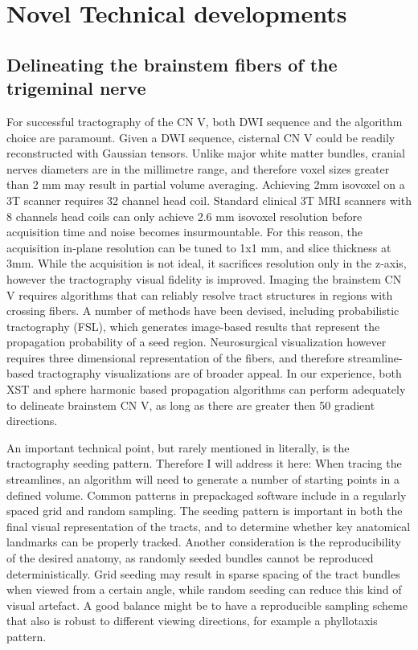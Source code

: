\section{Novel Technical developments}

\subsection{Delineating the brainstem fibers of the trigeminal nerve}

For successful tractography of the CN V, both DWI sequence and the algorithm choice are paramount. Given a DWI sequence, cisternal CN V could be readily reconstructed with Gaussian tensors. Unlike major white matter bundles, cranial nerves diameters are in the millimetre range, and therefore voxel sizes greater than 2 mm may result in partial volume averaging. Achieving 2mm isovoxel on a 3T scanner requires 32 channel head coil. Standard clinical 3T MRI scanners with 8 channels head coils can only achieve 2.6 mm isovoxel resolution before acquisition time and noise becomes insurmountable. For this reason, the acquisition in-plane resolution can be tuned to 1x1 mm, and slice thickness at 3mm. While the acquisition is not ideal, it sacrifices resolution only in the z-axis, however the tractography visual fidelity is improved. 
Imaging the brainstem CN V requires algorithms that can reliably resolve tract structures in regions with crossing fibers. A number of methods have been devised, including probabilistic tractography (FSL)\cite{Behrens2007}, which generates image-based results that represent the propagation probability of a seed region. Neurosurgical visualization however requires three dimensional representation of the fibers, and therefore streamline-based tractography visualizations are of broader appeal. In our experience, both XST and sphere harmonic based propagation algorithms can perform adequately to delineate brainstem CN V, as long as there are greater then 50 gradient directions. 

An important technical point, but rarely mentioned in literally, is the tractography seeding pattern. Therefore I will address it here: When tracing the streamlines, an algorithm will need to generate a number of starting points in a defined volume. Common patterns in prepackaged software include in a regularly spaced grid and random sampling. The seeding pattern is important in both the final visual representation of the tracts, and to determine whether key anatomical landmarks can be properly tracked. Another consideration is the reproducibility of the desired anatomy, as randomly seeded bundles cannot be reproduced deterministically. Grid seeding may result in sparse spacing of the tract bundles when viewed from a certain angle, while random seeding can reduce this kind of visual artefact. A good balance might be to have a reproducible sampling scheme that also is robust to different viewing directions, for example a phyllotaxis pattern.


